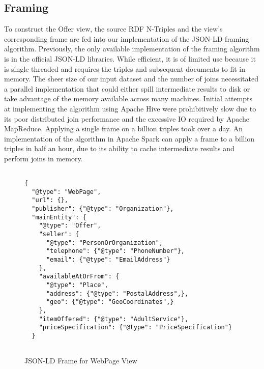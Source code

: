 \subsection{Framing}
To construct the Offer view, the source RDF N-Triples and the view's corresponding frame are fed into our implementation of the JSON-LD framing algorithm.  
Previously, the only available implementation of the framing algorithm is in the official JSON-LD libraries.  %
While efficient, it is of limited use because it  is single threaded and requires the triples and subsequent documents to fit in memory.
The sheer size of our input dataset and the number of joins necessitated a parallel implementation that could either spill intermediate results to disk or take advantage of the memory available across many machines. 
Initial attempts at implementing the algorithm using Apache Hive were prohibitively slow due to its poor distributed join performance and the excessive IO required by Apache MapReduce.  Applying a single frame on a billion triples took over a day.  
An implementation of the algorithm in Apache Spark can apply a frame to a billion triples in half an hour, due to its ability to cache intermediate results and perform joins in memory.   
\begin{figure}
\begin{verbatim}

{
  "@type": "WebPage",
  "url": {},
  "publisher": {"@type": "Organization"},
  "mainEntity": {
    "@type": "Offer",
    "seller": {
      "@type": "PersonOrOrganization",
      "telephone": {"@type": "PhoneNumber"},
      "email": {"@type": "EmailAddress"}
    },
    "availableAtOrFrom": {
      "@type": "Place",
      "address": {"@type": "PostalAddress",},
      "geo": {"@type": "GeoCoordinates",}
    },
    "itemOffered": {"@type": "AdultService"},
    "priceSpecification": {"@type": "PriceSpecification"}
  }


\end{verbatim}
\caption{JSON-LD Frame for WebPage View}
\label{fig:json_ld_webpage_view}
\end{figure}
